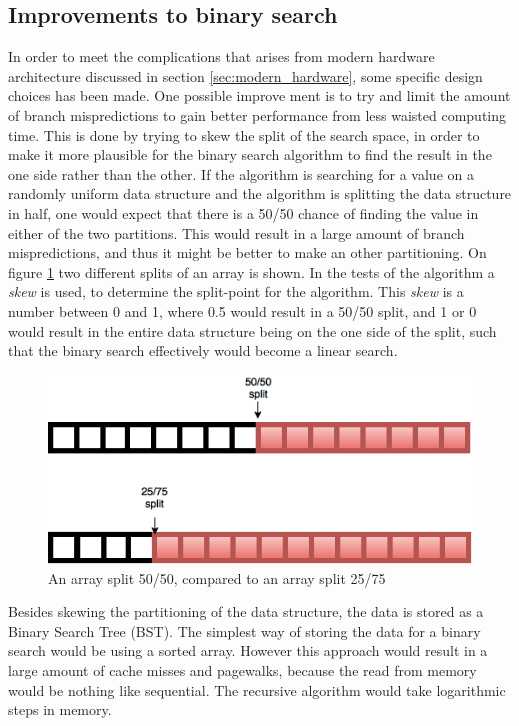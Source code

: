 \documentclass{article}
\begin{document}
\subsection{Improvements to binary search}
\label{sec:improvements}
In order to meet the complications that arises from modern hardware architecture discussed in section \ref{sec:modern_hardware}, some specific design choices has been made. One possible improve ment is to try and limit the amount of branch mispredictions to gain better performance from less waisted computing time. This is done by trying to skew the split of the search space, in order to make it more plausible for the binary search algorithm to find the result in the one side rather than the other. If the algorithm is searching for a value on a randomly uniform data structure and the algorithm is splitting the data structure in half, one would expect that there is a 50/50 chance of finding the value in either of the two partitions. This would result in a large amount of branch mispredictions, and thus it might be better to make an other partitioning. On figure \ref{fig:array_split} two different splits of an array is shown. In the tests of the algorithm a \textit{skew} is used, to determine the split-point for the algorithm. This \textit{skew} is a number between 0 and 1, where 0.5 would result in a 50/50 split, and 1 or 0 would result in the entire data structure being on the one side of the split, such that the binary search effectively would become a linear search.

\begin{figure}[H]
  \includegraphics[width=\textwidth]{figures/Array_eq_split}
  \caption{An array split 50/50, compared to an array split 25/75}
  \label{fig:array_split}
\end{figure}

Besides skewing the partitioning of the data structure, the data is stored as a Binary Search Tree (BST). The simplest way of storing the data for a binary search would be using a sorted array. However this approach would result in a large amount of cache misses and pagewalks, because the read from memory would be nothing like sequential. The recursive algorithm would take logarithmic steps in memory. 
\end{document}
